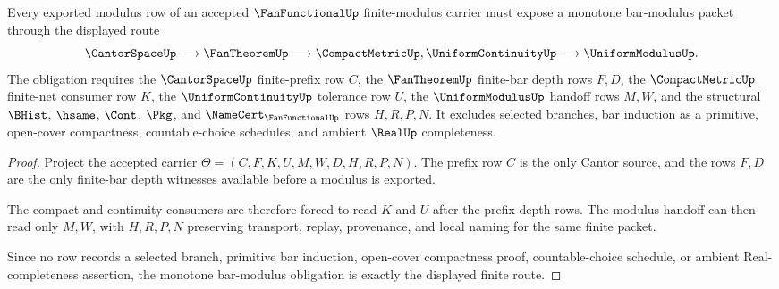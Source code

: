 \begin{theorem}
\label{thm:fan-functional-root-monotone-bar-obligation}
Every exported modulus row of an accepted $\FanFunctionalUp$ finite-modulus carrier must expose a monotone bar-modulus packet through the displayed route
$$
\CantorSpaceUp \longrightarrow \FanTheoremUp \longrightarrow \CompactMetricUp,\UniformContinuityUp \longrightarrow \UniformModulusUp .
$$
The obligation requires the $\CantorSpaceUp$ finite-prefix row $C$, the $\FanTheoremUp$ finite-bar depth rows $F,D$, the $\CompactMetricUp$ finite-net consumer row $K$, the $\UniformContinuityUp$ tolerance row $U$, the $\UniformModulusUp$ handoff rows $M,W$, and the structural $\BHist$, $\hsame$, $\Cont$, $\Pkg$, and $\NameCert_{\FanFunctionalUp}$ rows $H,R,P,N$. It excludes selected branches, bar induction as a primitive, open-cover compactness, countable-choice schedules, and ambient $\RealUp$ completeness.
\end{theorem}
\begin{proof}
Project the accepted carrier $\Theta=(C,F,K,U,M,W,D,H,R,P,N)$. The prefix row $C$ is the only Cantor source, and the rows $F,D$ are the only finite-bar depth witnesses available before a modulus is exported.

The compact and continuity consumers are therefore forced to read $K$ and $U$ after the prefix-depth rows. The modulus handoff can then read only $M,W$, with $H,R,P,N$ preserving transport, replay, provenance, and local naming for the same finite packet.

Since no row records a selected branch, primitive bar induction, open-cover compactness proof, countable-choice schedule, or ambient Real-completeness assertion, the monotone bar-modulus obligation is exactly the displayed finite route.
\end{proof}
